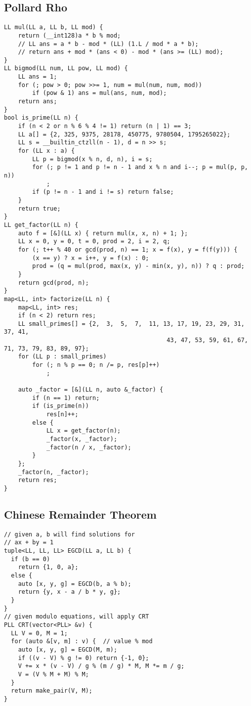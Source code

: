 \documentclass[FSZ,a4paper,onesided]{article}
\begin{document}
\begin{multicols*}{\COLS}
\begin{lstlisting}
\end{lstlisting}
\subsection{Pollard Rho}
\begin{lstlisting}
LL mul(LL a, LL b, LL mod) {
    return (__int128)a * b % mod;
    // LL ans = a * b - mod * (LL) (1.L / mod * a * b);
    // return ans + mod * (ans < 0) - mod * (ans >= (LL) mod);
}
LL bigmod(LL num, LL pow, LL mod) {
    LL ans = 1;
    for (; pow > 0; pow >>= 1, num = mul(num, num, mod))
        if (pow & 1) ans = mul(ans, num, mod);
    return ans;
}
bool is_prime(LL n) {
    if (n < 2 or n % 6 % 4 != 1) return (n | 1) == 3;
    LL a[] = {2, 325, 9375, 28178, 450775, 9780504, 1795265022};
    LL s = __builtin_ctzll(n - 1), d = n >> s;
    for (LL x : a) {
        LL p = bigmod(x % n, d, n), i = s;
        for (; p != 1 and p != n - 1 and x % n and i--; p = mul(p, p, n))
            ;
        if (p != n - 1 and i != s) return false;
    }
    return true;
}
LL get_factor(LL n) {
    auto f = [&](LL x) { return mul(x, x, n) + 1; };
    LL x = 0, y = 0, t = 0, prod = 2, i = 2, q;
    for (; t++ % 40 or gcd(prod, n) == 1; x = f(x), y = f(f(y))) {
        (x == y) ? x = i++, y = f(x) : 0;
        prod = (q = mul(prod, max(x, y) - min(x, y), n)) ? q : prod;
    }
    return gcd(prod, n);
}
map<LL, int> factorize(LL n) {
    map<LL, int> res;
    if (n < 2) return res;
    LL small_primes[] = {2,  3,  5,  7,  11, 13, 17, 19, 23, 29, 31, 37, 41,
                                              43, 47, 53, 59, 61, 67, 71, 73, 79, 83, 89, 97};
    for (LL p : small_primes)
        for (; n % p == 0; n /= p, res[p]++)
            ;

    auto _factor = [&](LL n, auto &_factor) {
        if (n == 1) return;
        if (is_prime(n))
            res[n]++;
        else {
            LL x = get_factor(n);
            _factor(x, _factor);
            _factor(n / x, _factor);
        }
    };
    _factor(n, _factor);
    return res;
}
\end{lstlisting}
\subsection{Chinese Remainder Theorem}
\begin{lstlisting}
// given a, b will find solutions for
// ax + by = 1
tuple<LL, LL, LL> EGCD(LL a, LL b) {
  if (b == 0)
    return {1, 0, a};
  else {
    auto [x, y, g] = EGCD(b, a % b);
    return {y, x - a / b * y, g};
  }
}
// given modulo equations, will apply CRT
PLL CRT(vector<PLL> &v) {
  LL V = 0, M = 1;
  for (auto &[v, m] : v) {  // value % mod
    auto [x, y, g] = EGCD(M, m);
    if ((v - V) % g != 0) return {-1, 0};
    V += x * (v - V) / g % (m / g) * M, M *= m / g;
    V = (V % M + M) % M;
  }
  return make_pair(V, M);
}
\end{lstlisting}

\end{multicols*}
\end{document}
